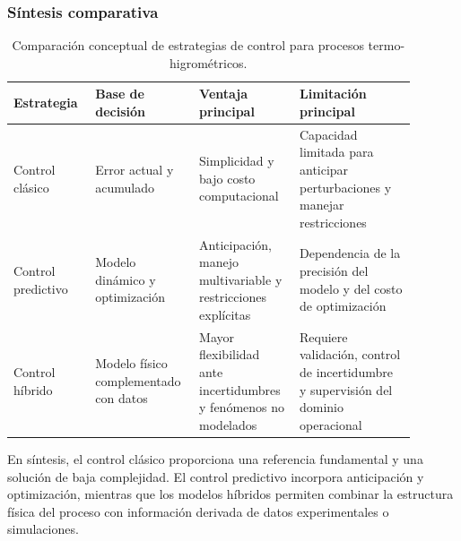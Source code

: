 \subsubsection{Síntesis comparativa}

\begin{table}
\centering
\caption{Comparación conceptual de estrategias de control para procesos termo-higrométricos.}
\label{tab:comparacion_control}
\begin{tabular}{
p{0.18\linewidth}
p{0.21\linewidth}
p{0.23\linewidth}
p{0.27\linewidth}
}
\toprule
Estrategia
&
Base de decisión
&
Ventaja principal
&
Limitación principal
\\
\midrule

Control clásico
&
Error actual y acumulado
&
Simplicidad y bajo costo computacional
&
Capacidad limitada para anticipar perturbaciones y manejar restricciones
\\[0.25cm]

Control predictivo
&
Modelo dinámico y optimización
&
Anticipación, manejo multivariable y restricciones explícitas
&
Dependencia de la precisión del modelo y del costo de optimización
\\[0.25cm]

Control híbrido
&
Modelo físico complementado con datos
&
Mayor flexibilidad ante incertidumbres y fenómenos no modelados
&
Requiere validación, control de incertidumbre y supervisión del dominio operacional
\\
\bottomrule
\end{tabular}
\end{table}

En síntesis, el control clásico proporciona una referencia fundamental y una solución de baja complejidad. El control predictivo incorpora anticipación y optimización, mientras que los modelos híbridos permiten combinar la estructura física del proceso con información derivada de datos experimentales o simulaciones.


